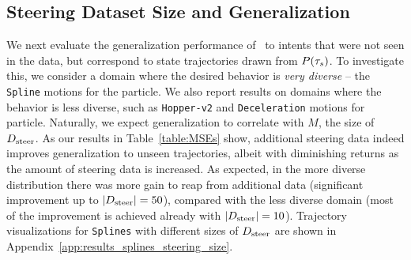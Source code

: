\documentclass[nohyperref]{article}
\begin{document}
\subsection*{Steering Dataset Size and Generalization}
\label{ssec:steering_size}
We next evaluate the generalization performance of \methodname\ to intents that were not seen in the data, but correspond to state trajectories drawn from $P(\tau_{s})$. To investigate this, we consider a domain where the desired behavior is \textit{very diverse} -- the \texttt{Spline} motions for the particle. 
We also report results on domains where the behavior is less diverse, such as \texttt{Hopper-v2} and \texttt{Deceleration} motions for particle.
Naturally, we expect generalization to correlate with $M$, the size of $D_{\mathrm{steer}}$. As our results in Table~\ref{table:MSEs} show, additional steering data indeed improves generalization to unseen trajectories, albeit with diminishing returns as the amount of steering data is increased. As expected, in the more diverse distribution there was more gain to reap from additional data (significant improvement up to $|D_{\mathrm{steer}}|=50$), compared with the less diverse domain (most of the improvement is achieved already with $|D_{\mathrm{steer}}|=10$).
Trajectory visualizations for \texttt{Splines} with different sizes of $D_{\mathrm{steer}}$ are shown in Appendix~\ref{app:results_splines_steering_size}.

\begin{table}[]
    \caption{
    Steering Dataset Size and Generalization. Here $T=64$, and we show MSE averaged over 3 random seeds.
    Note that $|\steeringbuffer|=0$ represents the case where no steering is used at all. In this case, we use trajectories sampled from a random policy to initialize $|\prevbuffer|$ (see Algorithm~\ref{alg:ESI}). (*)~For \texttt{Hopper-v2}, the maximal $|\steeringbuffer|$ is $1740$ due to a limited amount of data in D4RL.  
    }
    \vspace{-0.5em}
    \label{table:MSEs}
\end{table}
\end{document}
